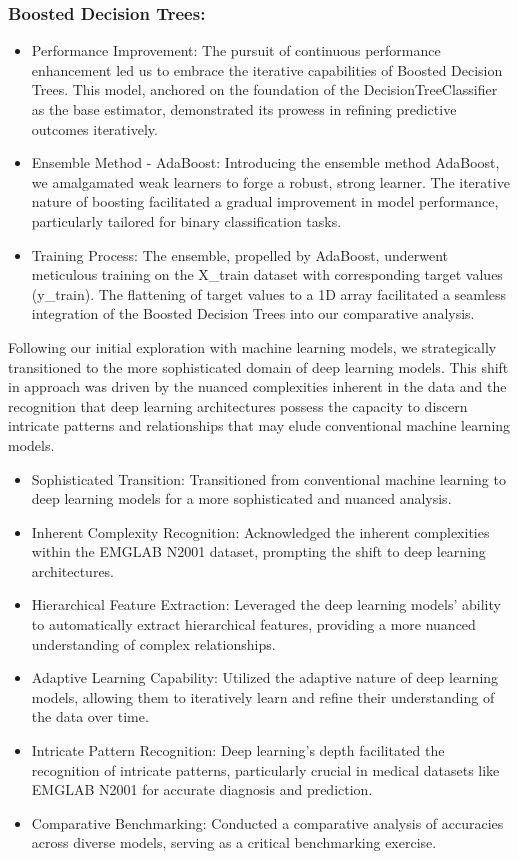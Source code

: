 \documentclass[ 12pt,a4paper,twocolumn,fleqn]{report}
\begin{document}
\subsubsection{Boosted Decision Trees:}
\vspace{2mm}
\begin{itemize}
    \item Performance Improvement: The pursuit of continuous performance enhancement led us to
embrace the iterative capabilities of Boosted Decision Trees. This model, anchored on the
foundation of the DecisionTreeClassifier as the base estimator, demonstrated its prowess in
refining predictive outcomes iteratively.
\item Ensemble Method - AdaBoost: Introducing the ensemble method AdaBoost, we amalgamated
weak learners to forge a robust, strong learner. The iterative nature of boosting facilitated a
gradual improvement in model performance, particularly tailored for binary classification tasks.
\item Training Process: The ensemble, propelled by AdaBoost, underwent meticulous training on the
X\_train dataset with corresponding target values (y\_train). The flattening of target values to a
1D array facilitated a seamless integration of the Boosted Decision Trees into our comparative
analysis.

\end{itemize}
Following our initial exploration with machine learning models, we strategically transitioned to the
more sophisticated domain of deep learning models. This shift in approach was driven by the nuanced
complexities inherent in the data and the recognition that deep learning architectures possess the
capacity to discern intricate patterns and relationships that may elude conventional machine learning
models.
\begin{itemize}
    \item Sophisticated Transition: Transitioned from conventional machine learning to deep learning
models for a more sophisticated and nuanced analysis.
\item Inherent Complexity Recognition: Acknowledged the inherent complexities within the
EMGLAB N2001 dataset, prompting the shift to deep learning architectures.
\item Hierarchical Feature Extraction: Leveraged the deep learning models' ability to automatically
extract hierarchical features, providing a more nuanced understanding of complex relationships.
\item Adaptive Learning Capability: Utilized the adaptive nature of deep learning models, allowing
them to iteratively learn and refine their understanding of the data over time.
\item Intricate Pattern Recognition: Deep learning's depth facilitated the recognition of intricate
patterns, particularly crucial in medical datasets like EMGLAB N2001 for accurate diagnosis
and prediction.
\item Comparative Benchmarking: Conducted a comparative analysis of accuracies across diverse
models, serving as a critical benchmarking exercise.
\end{itemize}
\end{document}
